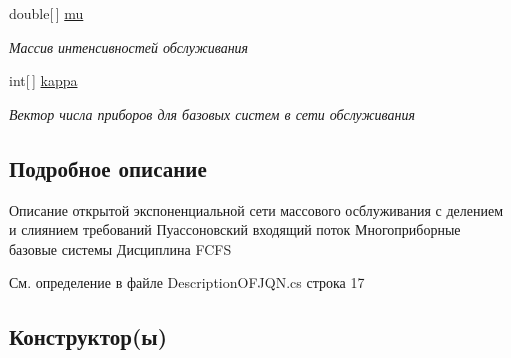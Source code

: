 \begin{DoxyCompactItemize}
double\mbox{[}$\,$\mbox{]} \hyperlink{class_network_descriptions_1_1_description_o_f_j_q_n_a378792ff9db7825dfeee852298fd3314}{mu}
\begin{DoxyCompactList}\small\item\em Массив интенсивностей обслуживания \end{DoxyCompactList}\item 
int\mbox{[}$\,$\mbox{]} \hyperlink{class_network_descriptions_1_1_description_o_f_j_q_n_a3a88e6ce220ecbbe4a056fedc8d6595c}{kappa}
\begin{DoxyCompactList}\small\item\em Вектор числа приборов для базовых систем в сети обслуживания \end{DoxyCompactList}\end{DoxyCompactItemize}


\subsection{Подробное описание}
Описание открытой экспоненциальной сети массового осблуживания с делением и слиянием требований Пуассоновский входящий поток Многоприборные базовые системы Дисциплина F\+C\+FS 



См. определение в файле Description\+O\+F\+J\+Q\+N.\+cs строка 17



\subsection{Конструктор(ы)}
